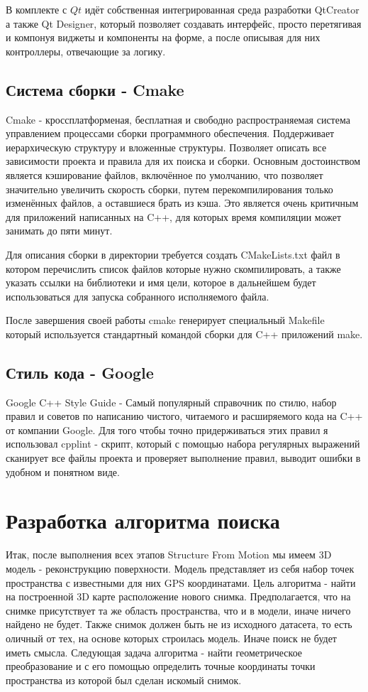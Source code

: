 В комплекте с $Qt$ идёт собственная интегрированная среда разработки QtCreator а также Qt Designer, который позволяет создавать интерфейс, просто перетягивая и компонуя виджеты и компоненты на форме, а после описывая для них контроллеры, отвечающие за логику. 

\subsection{Система сборки - Cmake}
Cmake - кроссплатформеная, бесплатная и свободно распространяемая система управлением процессами сборки программного обеспечения. Поддерживает иерархическую структуру и вложенные структуры. Позволяет описать все зависимости проекта и правила для их поиска и сборки. Основным достоинством является кэширование файлов, включённое по умолчанию, что позволяет значительно увеличить скорость сборки, путем перекомпилирования только изменённых файлов, а оставшиеся брать из кэша. Это является очень критичным для приложений написанных на C++, для которых время компиляции может занимать до пяти минут.

Для описания сборки в директории требуется создать CMakeLists.txt файл в котором перечислить список файлов которые нужно скомпилировать, а также указать ссылки на библиотеки и имя цели, которое в дальнейшем будет использоваться для запуска собранного исполняемого файла.

После завершения своей работы cmake генерирует специальный Makefile который используется стандартный командой сборки для C++ приложений make.

\subsection{Стиль кода - Google}

Google C++ Style Guide - Самый популярный справочник по стилю, набор правил и советов по написанию чистого, читаемого и расширяемого кода на C++ от компании Google. Для того чтобы точно придерживаться этих правил я использовал cpplint - скрипт, который с помощью набора регулярных выражений сканирует все файлы проекта и проверяет выполнение правил, выводит ошибки в удобном и понятном виде.

\section{Разработка алгоритма поиска}
Итак, после выполнения всех этапов Structure From Motion мы имеем 3D модель - реконструкцию поверхности. Модель представляет из себя набор точек пространства с известными для них GPS координатами. Цель алгоритма - найти на построенной 3D карте расположение нового снимка. Предполагается, что на снимке присутствует та же область пространства, что и в модели, иначе ничего найдено не будет. Также снимок должен быть не из исходного датасета, то есть оличный от тех, на основе которых строилась модель. Иначе поиск не будет иметь смысла. Следующая задача алгоритма - найти геометрическое преобразование и с его помощью определить точные координаты точки пространства из которой был сделан искомый снимок.

